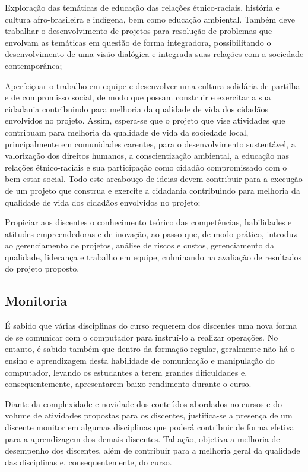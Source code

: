 \documentclass[
	12pt,				%
	openright,			%
	twoside,			%
	a4paper,			%
	chapter=TITLE,		%
	english,			%
	french,				%
	spanish,			%
	brazil,				%
	]{abntex2}
\begin{document}
\begin{alineas}
	\item Exploração das temáticas de educação das relações étnico-raciais, história e cultura afro-brasileira e indígena, bem como educação ambiental. Também deve trabalhar o desenvolvimento de projetos para resolução de problemas que envolvam as temáticas em questão de forma integradora, possibilitando  o desenvolvimento de uma visão dialógica e integrada  suas relações com a sociedade contemporânea;
	\item Aperfeiçoar o trabalho em equipe e desenvolver uma cultura solidária de partilha e de compromisso social, de modo que possam construir e exercitar a sua cidadania contribuindo para melhoria da qualidade de vida dos cidadãos envolvidos no projeto. Assim, espera-se que o projeto que vise atividades que contribuam para melhoria da qualidade de vida da sociedade local, principalmente em comunidades carentes, para o desenvolvimento sustentável, a valorização dos direitos humanos, a conscientização ambiental, a educação nas relações étnico-raciais e sua participação como cidadão compromissado com o bem-estar social. Todo este arcabouço de ideias devem contribuir para a execução de um projeto que construa e exercite a cidadania contribuindo para melhoria da qualidade de vida dos cidadãos envolvidos no projeto;
	\item Propiciar aos discentes o conhecimento teórico das competências, habilidades e atitudes empreendedoras e de inovação, ao passo que, de modo prático, introduz ao gerenciamento de projetos, análise de riscos e custos, gerenciamento da qualidade, liderança e trabalho em equipe, culminando na avaliação de resultados do projeto proposto.


\end{alineas}


\subsection{Monitoria}

É sabido que várias disciplinas do curso  requerem dos discentes  uma nova forma de se comunicar com o computador para instruí-lo a realizar operações. No entanto, é sabido também que dentro da formação regular, geralmente não há o ensino e aprendizagem desta  habilidade de comunicação e manipulação do computador,  levando os estudantes a terem grandes dificuldades e, consequentemente, apresentarem baixo rendimento durante o curso.

Diante da complexidade e novidade dos conte\'udos abordados no cursos e do  volume de atividades propostas para os discentes, justifica-se a presen\c{c}a de um discente monitor em algumas disciplinas que poder\'a contribuir de forma efetiva para a aprendizagem dos demais discentes. Tal a\c{c}\~ao, objetiva a melhoria de  desempenho dos discentes, al\'em de contribuir para a melhoria geral da qualidade das disciplinas e, consequentemente, do curso. 
\end{document}

